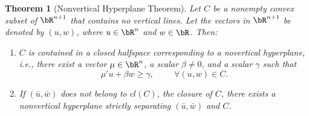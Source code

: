 \documentclass[11pt,a4paper,oneside,openany]{book}
\newtheorem{theorem}{Theorem}
\numberwithin{definition}{section}
\numberwithin{theorem}{section}
\numberwithin{problem}{section}
\begin{document}
\begin{theorem}[Nonvertical Hyperplane Theorem]
    Let $C$ be a  nonempty convex subset of $\bR^{n+1}$ that contains no vertical lines. Let the vectors in $\bR^{n+1}$ be denoted by $(u,w)$, where $u \in \bR^n$ and  $w \in \bR$. Then:
    \begin{enumerate}
        \item $C$ is contained in a closed halfspace corresponding to a novertical hyperplane, i.e., there exist a vector $\mu \in \bR^n$, a scalar $\beta \neq 0$, and a scalar $\gamma$ such that
        \begin{equation}
            \mu'u + \beta w \geq \gamma, \hspace{1cm} \forall (u,w) \in C.
        \end{equation}
        \item If $(\bar u, \bar w)$ does not belong to $cl(C)$, the closure of $C$, there exists a nonvertical hyperplane strictly separating $(\bar u, \bar w)$ and $C$.
    \end{enumerate}
\end{theorem}
\end{document}
